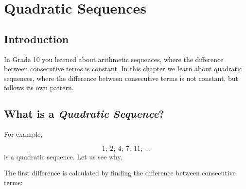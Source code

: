 \chapter{Quadratic Sequences}
\label{m:pin:g11}


\section{Introduction}
In Grade 10 you learned about arithmetic sequences, where the
difference between consecutive terms is constant. In this chapter we
learn about quadratic sequences, where the difference between
consecutive terms is not constant, but follows its own pattern.


\section{What is a \textit{Quadratic Sequence}?}


For example, 

\begin{equation}
\label{eq:mp:s:quadseq:1}
1; \: 2; \: 4; \: 7; \: 11; \: \ldots
\end{equation}
is a quadratic sequence. Let us see why.

The first difference is calculated by finding the difference between consecutive terms:

